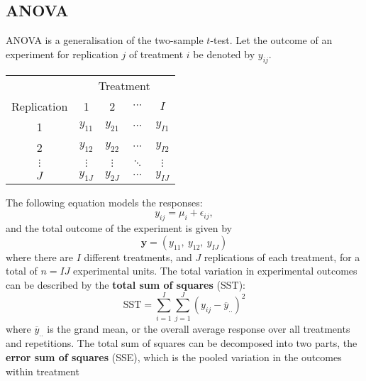 \documentclass{article}
\begin{document}
\subsection{ANOVA}
ANOVA is a generalisation of the two-sample \(t\)-test. Let the outcome
of an experiment for replication \(j\) of treatment \(i\) be denoted by
\(y_{ij}\).
\begin{table}[H]
    \centering
    \begin{tabular}{c | c c c c}
        \toprule
                    & \multicolumn{4}{c}{Treatment}                                        \\
        Replication & 1                             & 2          & \(\cdots\) & \(I\)      \\
        \midrule
        1           & \(y_{11}\)                    & \(y_{21}\) & \(\cdots\) & \(y_{I1}\) \\
        2           & \(y_{12}\)                    & \(y_{22}\) & \(\cdots\) & \(y_{I2}\) \\
        \(\vdots\)  & \(\vdots\)                    & \(\vdots\) & \(\ddots\) & \(\vdots\) \\
        \(J\)       & \(y_{1J}\)                    & \(y_{2J}\) & \(\cdots\) & \(y_{IJ}\) \\
        \bottomrule
    \end{tabular}
\end{table}
The following equation models the responses:
\begin{equation*}
    y_{ij} = \mu_i + \epsilon_{ij},
\end{equation*}
and the total outcome of the experiment is given by
\begin{equation*}
    \symbf{y} = \left( y_{11},\: y_{12},\: y_{IJ} \right)
\end{equation*}
where there are \(I\) different treatments, and \(J\) replications of
each treatment, for a total of \(n = IJ\) experimental units. The total
variation in experimental outcomes can be described by the \textbf{total
    sum of squares} (SST):
\begin{equation*}
    \mathrm{SST} = \sum_{i = 1}^I \sum_{j = 1}^J \left( y_{ij} - \overline{y}_{..} \right)^2
\end{equation*}
where \(\overline{y}_{..}\) is the grand mean, or the overall average
response over all treatments and repetitions. The total sum of squares
can be decomposed into two parts, the \textbf{error sum of squares}
(SSE), which is the pooled variation in the outcomes within treatment
\end{document}
